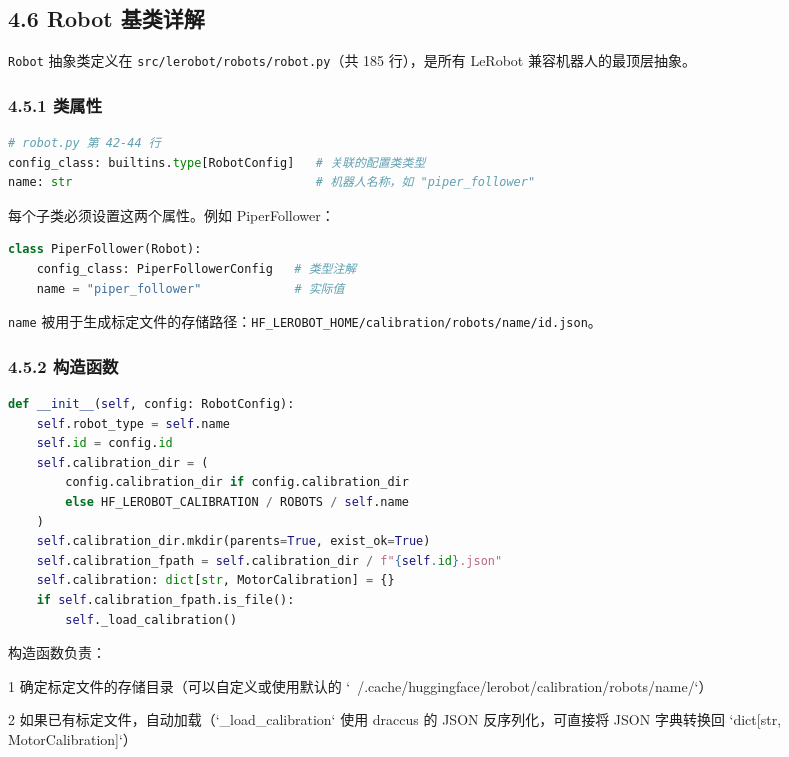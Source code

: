 \documentclass[UTF8,a4paper,11pt]{ctexart}
\begin{document}
\subsection{4.6 Robot 基类详解}

\texttt{Robot} 抽象类定义在 \texttt{src/lerobot/robots/robot.py}（共 185 行），是所有 LeRobot 兼容机器人的最顶层抽象。

\subsubsection{4.5.1 类属性}

\begin{lstlisting}[language=python]
# robot.py 第 42-44 行
config_class: builtins.type[RobotConfig]   # 关联的配置类类型
name: str                                  # 机器人名称，如 "piper_follower"
\end{lstlisting}

每个子类必须设置这两个属性。例如 PiperFollower：

\begin{lstlisting}[language=python]
class PiperFollower(Robot):
    config_class: PiperFollowerConfig   # 类型注解
    name = "piper_follower"             # 实际值
\end{lstlisting}

\texttt{name} 被用于生成标定文件的存储路径：\texttt{HF_LEROBOT_HOME/calibration/robots/{name}/{id}.json}。

\subsubsection{4.5.2 构造函数}

\begin{lstlisting}[language=python]
def __init__(self, config: RobotConfig):
    self.robot_type = self.name
    self.id = config.id
    self.calibration_dir = (
        config.calibration_dir if config.calibration_dir
        else HF_LEROBOT_CALIBRATION / ROBOTS / self.name
    )
    self.calibration_dir.mkdir(parents=True, exist_ok=True)
    self.calibration_fpath = self.calibration_dir / f"{self.id}.json"
    self.calibration: dict[str, MotorCalibration] = {}
    if self.calibration_fpath.is_file():
        self._load_calibration()
\end{lstlisting}

构造函数负责：
\item[1] 确定标定文件的存储目录（可以自定义或使用默认的 `~/.cache/huggingface/lerobot/calibration/robots/{name}/`）
\item[2] 如果已有标定文件，自动加载（`_load_calibration` 使用 draccus 的 JSON 反序列化，可直接将 JSON 字典转换回 `dict[str, MotorCalibration]`）
\end{document}
